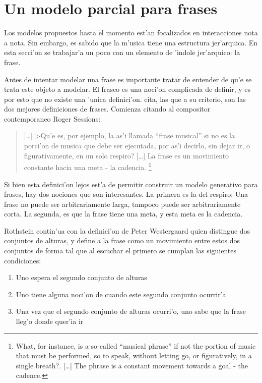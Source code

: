 \section{Un modelo parcial para frases}
\label{sec:phrases}
Los modelos propuestos hasta el momento est'an focalizados en interacciones nota a nota. Sin embargo, es sabido que la m'usica
tiene una estructura jer'arquica. En esta secci'on se trabajar'a un poco con un elemento de 'indole jer'arquico: la frase. 

Antes de intentar modelar una frase es importante tratar de entender de qu'e se trata este objeto a modelar. El fraseo es una
noci'on complicada de definir, y es por esto que no existe una 'unica definici'on. \cite{rothstein1989phrase} cita, las que 
a su criterio, son las dos mejores definiciones de frases. Comienza citando al compositor contemporaneo
Roger Sessions: 

\begin{quote} 
[\ldots] >Qu'e es, por ejemplo, la as'i llamada ``frase musical'' si no es la porci'on de musica que debe ser ejecutada, por as'i decirlo,
sin dejar ir, o figurativamente, en un solo respiro? [\ldots] La frase es un movimiento constante hacia una meta - la cadencia. \footnote{ 
What, for instance, is a so-called ``musical phrase'' if not the portion of music that must be performed, so to speak, 
without letting go, or figuratively, in a single breath?. [\ldots] The phrase is a constant movement towards a goal - the cadence.}
\end{quote}

Si bien esta definici'on lejos est'a de permitir construir un modelo generativo para frases, hay dos nociones que son interesantes. 
La primera es la del respiro: Una frase no puede ser arbitrariamente larga, tampoco puede ser arbitrariamente corta. La 
segunda, es que la frase tiene una meta, y esta meta es la cadencia.%

Rothstein contin'ua con la definici'on de Peter Westergaard quien distingue dos conjuntos de alturas, y define
a la frase como un movimiento entre estos dos conjuntos de forma tal que al escuchar el primero se cumplan las siguientes condiciones:
\begin{enumerate}
 \item Uno espera el segundo conjunto de alturas
 \item Uno tiene alguna noci'on de cuando este segundo conjunto ocurrir'a
 \item Una vez que el segundo conjunto de alturas ocurri'o, uno sabe que la frase lleg'o donde quer'ia ir
\end{enumerate}


